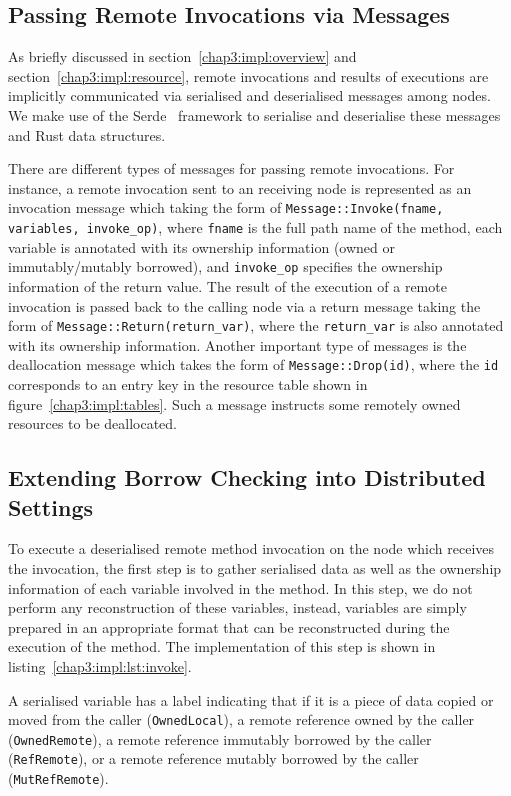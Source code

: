 \subsection{Passing Remote Invocations via Messages}
\label{impl:message}
As briefly discussed in section~\ref{chap3:impl:overview} and section~\ref{chap3:impl:resource}, remote invocations and results of executions are implicitly communicated via serialised and deserialised messages among nodes. We make use of the Serde~\citep{serde} framework to serialise and deserialise these messages and Rust data structures.

There are different types of messages for passing remote invocations. For instance, a remote invocation sent to an receiving node is represented as an invocation message which taking the form of \texttt{Message::Invoke(fname, variables, invoke\_op)}, where \texttt{fname} is the full path name of the method, each variable is annotated with its ownership information (owned or immutably/mutably borrowed), and \texttt{invoke\_op} specifies the ownership information of the return value. The result of the execution of a remote invocation is passed back to the calling node via a return message taking the form of \texttt{Message::Return(return\_var)}, where the \texttt{return\_var} is also annotated with its ownership information. Another important type of messages is the deallocation message which takes the form of \texttt{Message::Drop(id)}, where the \texttt{id} corresponds to an entry key in the resource table shown in figure~\ref{chap3:impl:tables}. Such a message instructs some remotely owned resources to be deallocated.

\subsection{Extending Borrow Checking into Distributed Settings}
\label{chap3:impl:borrow}
To execute a deserialised remote method invocation on the node which receives the invocation, the first step is to gather serialised data as well as the ownership information of each variable involved in the method. In this step, we do not perform any reconstruction of these variables, instead, variables are simply prepared in an appropriate format that can be reconstructed during the execution of the method. The implementation of this step is shown in listing~\ref{chap3:impl:lst:invoke}.

A serialised variable has a label indicating that if it is a piece of data copied or moved from the caller (\texttt{OwnedLocal}), a remote reference owned by the caller (\texttt{OwnedRemote}), a remote reference immutably borrowed by the caller (\texttt{RefRemote}), or a remote reference mutably borrowed by the caller (\texttt{MutRefRemote}). 

